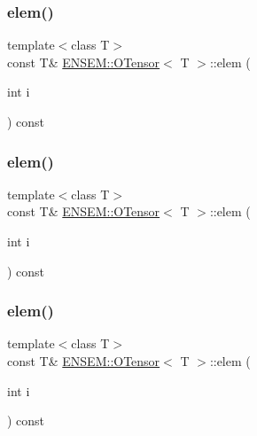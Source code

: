 \mbox{\label{classENSEM_1_1OTensor_a788f146a247856d6b391cfd8f903657b}} 
\subsubsection{\texorpdfstring{elem()}{elem()}\hspace{0.1cm}{\footnotesize\ttfamily [4/6]}}
{\footnotesize\ttfamily template$<$class T$>$ \\
const T\& \mbox{\hyperlink{classENSEM_1_1OTensor}{E\+N\+S\+E\+M\+::\+O\+Tensor}}$<$ T $>$\+::elem (\begin{DoxyParamCaption}\item[{int}]{i }\end{DoxyParamCaption}) const\hspace{0.3cm}{\ttfamily [inline]}}

\mbox{\label{classENSEM_1_1OTensor_a788f146a247856d6b391cfd8f903657b}} 
\subsubsection{\texorpdfstring{elem()}{elem()}\hspace{0.1cm}{\footnotesize\ttfamily [5/6]}}
{\footnotesize\ttfamily template$<$class T$>$ \\
const T\& \mbox{\hyperlink{classENSEM_1_1OTensor}{E\+N\+S\+E\+M\+::\+O\+Tensor}}$<$ T $>$\+::elem (\begin{DoxyParamCaption}\item[{int}]{i }\end{DoxyParamCaption}) const\hspace{0.3cm}{\ttfamily [inline]}}

\mbox{\label{classENSEM_1_1OTensor_a788f146a247856d6b391cfd8f903657b}} 
\subsubsection{\texorpdfstring{elem()}{elem()}\hspace{0.1cm}{\footnotesize\ttfamily [6/6]}}
{\footnotesize\ttfamily template$<$class T$>$ \\
const T\& \mbox{\hyperlink{classENSEM_1_1OTensor}{E\+N\+S\+E\+M\+::\+O\+Tensor}}$<$ T $>$\+::elem (\begin{DoxyParamCaption}\item[{int}]{i }\end{DoxyParamCaption}) const\hspace{0.3cm}{\ttfamily [inline]}}

